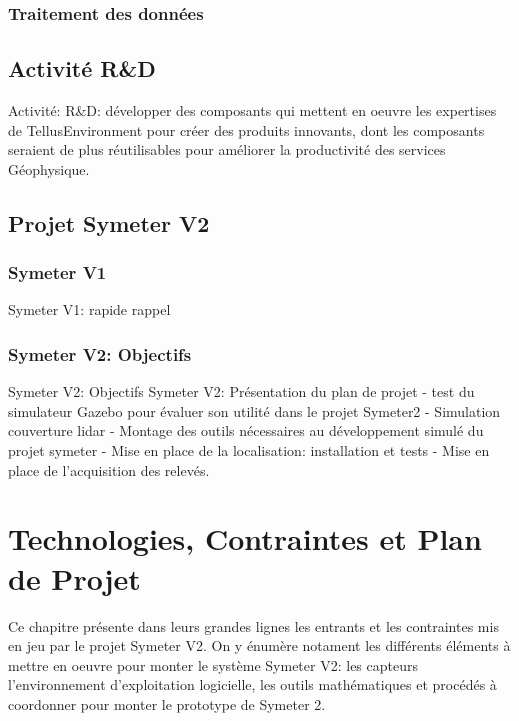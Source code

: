\documentclass[12pt,a4paper]{report}
\begin{document}
	\subsection{Traitement des données}

	\section{Activité R\&D}
	
	Activité: R\&D: développer des composants qui mettent en oeuvre les expertises de TellusEnvironment pour créer des produits innovants, dont les composants seraient de plus réutilisables pour améliorer la productivité des services Géophysique.


	\section{Projet Symeter V2}
		\subsection{Symeter V1}
		Symeter V1: rapide rappel
		
		\subsection{Symeter V2: Objectifs}
		Symeter V2: Objectifs
		Symeter V2: Présentation du plan de projet
- test du simulateur Gazebo pour évaluer son utilité dans le projet Symeter2
- Simulation couverture lidar
- Montage des outils nécessaires au développement simulé du projet symeter
- Mise en place de la localisation: installation et tests
- Mise en place de l'acquisition des relevés.

\chapter{Technologies, Contraintes et Plan de Projet}
	Ce chapitre présente dans leurs grandes lignes les entrants et les contraintes mis en jeu par le projet Symeter V2. On y énumère notament les différents éléments à mettre en oeuvre pour monter le système Symeter V2: les capteurs l'environnement d'exploitation logicielle, les outils mathématiques et procédés à coordonner pour monter le prototype de Symeter 2.
	
\end{document}
